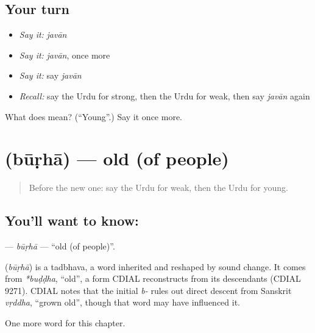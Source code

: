 \subsection*{Your turn}
\begin{itemize}
\raggedright
  \item \emph{Say it:} \emph{javān}
  \item \emph{Say it:} \emph{javān}, once more
  \item \emph{Say it:} say \emph{javān}
  \item \emph{Recall:} say the Urdu for strong, then the Urdu for weak, then say \emph{javān} again
\end{itemize}

\begin{tcolorbox}[breakable,colback=teal!4,colframe=teal!35!black,title={Before you move on}]
What does  mean? (\textquotedblleft{}Young\textquotedblright{}.) Say it once more.
\end{tcolorbox}
\section[\texorpdfstring{\ur{بوڑھا} (būṛhā)}{بوڑھا (būṛhā)}]{ (būṛhā) — old (of people)}

\label{lesson:UR-C133-burha}



\begin{quote}
Before the new one: say the Urdu for weak, then the Urdu for young.
\end{quote}

\subsection*{You'll want to know: }
\textbf{} — \emph{būṛhā} — \textquotedblleft{}old (of people)\textquotedblright{}.

\begin{cousinweb}
\textbf{} (\emph{būṛhā}) is a tadbhava, a word inherited and reshaped by sound change. It comes from \emph{*buḍḍha}, \textquotedblleft{}old\textquotedblright{}, a form CDIAL reconstructs from its descendants (CDIAL 9271). CDIAL notes that the initial \emph{b-} rules out direct descent from Sanskrit \emph{vṛddha}, \textquotedblleft{}grown old\textquotedblright{}, though that word may have influenced it.
\end{cousinweb}

\begin{grammarlens}[title={What you've built}]
One more word for this chapter.
\end{grammarlens}

